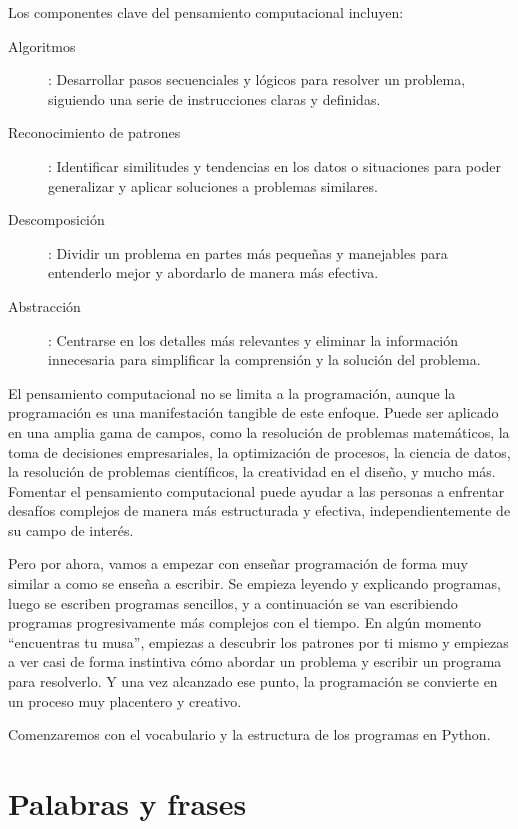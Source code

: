 Los componentes clave del pensamiento computacional incluyen:

\begin{description}
\item[Algoritmos]: Desarrollar pasos secuenciales y lógicos para resolver un problema, siguiendo una serie de instrucciones claras y definidas.

\item[Reconocimiento de patrones]: Identificar similitudes y tendencias en los datos o situaciones para poder generalizar y aplicar soluciones a problemas similares.

\item[Descomposición]: Dividir un problema en partes más pequeñas y manejables para entenderlo mejor y abordarlo de manera más efectiva.


\item[Abstracción]: Centrarse en los detalles más relevantes y eliminar la información innecesaria para simplificar la comprensión y la solución del problema.
\end{description}

El pensamiento computacional no se limita a la programación, aunque la programación es una manifestación tangible de este enfoque. Puede ser aplicado en una amplia gama de campos, como la resolución de problemas matemáticos, la toma de decisiones empresariales, la optimización de procesos, la ciencia de datos, la resolución de problemas científicos, la creatividad en el diseño, y mucho más. Fomentar el pensamiento computacional puede ayudar a las personas a enfrentar desafíos complejos de manera más estructurada y efectiva, independientemente de su campo de interés.

Pero por ahora, vamos a empezar con enseñar programación de forma
muy similar a como se enseña a escribir. Se empieza leyendo y explicando
programas, luego se escriben programas sencillos, y a continuación se
van escribiendo programas progresivamente más complejos con el tiempo.
En algún momento ``encuentras tu musa'', empiezas a descubrir los
patrones por ti mismo y empiezas a ver casi de forma instintiva cómo
abordar un problema y escribir un programa para resolverlo. Y una vez
alcanzado ese punto, la programación se convierte en un proceso muy
placentero y creativo.

Comenzaremos con el vocabulario y la estructura de los programas en
Python. 

\hypertarget{palabras-y-frases}{%
\section{Palabras y frases}\label{palabras-y-frases}}

